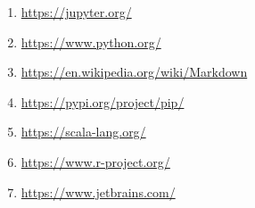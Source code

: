\documentclass[pdftex,12pt]{artikel3}
\begin{document}
\begin{enumerate}
\item
\url{https://jupyter.org/}
\item
\url{https://www.python.org/}
\item
\url{https://en.wikipedia.org/wiki/Markdown}
\item
\url{https://pypi.org/project/pip/}
\item
\url{https://scala-lang.org/}
\item
\url{https://www.r-project.org/}
\item
\url{https://www.jetbrains.com/}
\end{enumerate}

\newpage

\printindex
\end{document}
